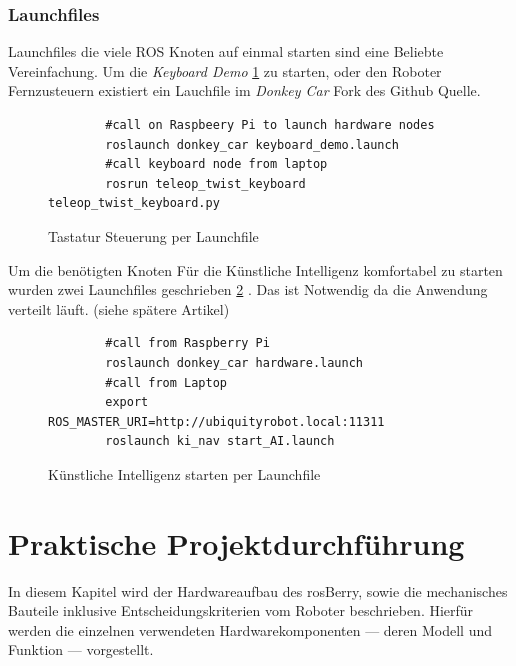 \documentclass[conference]{IEEEtran}
\begin{document}
	\subsubsection{Launchfiles}
	
	Launchfiles die viele ROS Knoten auf einmal starten sind eine Beliebte 
	Vereinfachung. Um die \textit{Keyboard Demo}  \ref{demo} zu starten, oder 
	den Roboter Fernzusteuern existiert ein Lauchfile im \textit{Donkey Car} 
	Fork 
	des Github Quelle.
	\begin{figure}
		\centering
		\begin{verbatim}
		#call on Raspbeery Pi to launch hardware nodes
		roslaunch donkey_car keyboard_demo.launch
		#call keyboard node from laptop 
		rosrun teleop_twist_keyboard teleop_twist_keyboard.py
		\end{verbatim}
		\label{demo}
		\caption{Tastatur Steuerung per Launchfile }
	\end{figure}
	
	Um die benötigten Knoten Für die Künstliche Intelligenz komfortabel zu 
	starten wurden zwei Launchfiles geschrieben \ref{KI-launch} .  Das ist 
	Notwendig da die 
	Anwendung verteilt läuft. (siehe spätere Artikel)
	
	\begin{figure}
		\centering
		\begin{verbatim}
		#call from Raspberry Pi
		roslaunch donkey_car hardware.launch
		#call from Laptop
		export ROS_MASTER_URI=http://ubiquityrobot.local:11311
		roslaunch ki_nav start_AI.launch
		\end{verbatim}
		\label{KI-launch}
		\caption{Künstliche Intelligenz starten per Launchfile }
	\end{figure}
	
	\section{Praktische Projektdurchführung}
	
	
	In diesem Kapitel wird der Hardwareaufbau des rosBerry, sowie die mechanisches Bauteile inklusive Entscheidungskriterien vom Roboter beschrieben. 
	Hierfür werden die einzelnen verwendeten Hardwarekomponenten — deren Modell und Funktion — vorgestellt. 
	
\end{document}
